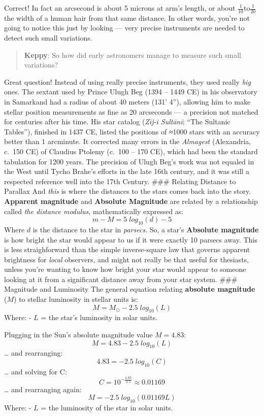 \documentclass[
  letterpaper,
]{book}
\begin{document}
Correct! In fact an arcsecond is about 5 microns at arm's length, or
about \(\frac{1}{10} \text{to} \frac{1}{20}\) the width of a human hair
from that same distance. In other words, you're not going to notice this
just by looking --- very precise instruments are needed to detect such
small variations.

\begin{quote}
\textbf{Keppy}: So how did early astronomers manage to measure such
small variations?
\end{quote}

Great question! Instead of using really precise instruments, they used
really \emph{big} ones. The sextant used by Prince Ulugh Beg (1394 --
1449 CE) in his observatory in Samarkand had a radius of about 40 meters
(131' 4''), allowing him to make stellar position measurements as fine
as 20 arcseconds --- a precision not matched for centuries after his
time. His star catalog (\emph{Zīj-i Sultānī}; ``The Sultanic Tables''),
finished in 1437 CE, listed the positions of ≈1000 stars with an
accuracy better than 1 arcminute. It corrected many errors in the
\emph{Almagest} (Alexandria, c.~150 CE) of Claudius Ptolemy (c.~100 --
170 CE), which had been the standard tabulation for 1200 years. The
precision of Ulugh Beg's work was not equaled in the West until Tycho
Brahe's efforts in the late 16th century, and it was still a respected
reference well into the 17th Century. \#\#\# Relating Distance to
Parallax And \emph{this} is where the distances to the stars comes back
into the story. \textbf{Apparent magnitude} and \textbf{Absolute
Magnitude} are related by a relationship called \emph{the distance
modulus}, mathematically expressed as: \[
m - M = 5\;log_{10}(d) - 5
\] Where \(d\) is the distance to the star in \emph{parsecs}. So, a
star's \textbf{Absolute magnitude} is how bright the star would appear
to us if it were exactly 10 parsecs away. This is less straighforward
than the simple inverse-square law that governs apparent brightness for
\emph{local} observers, and might not really be that useful for
thesiasts, unless you're wanting to know how bright your star would
appear to someone looking at it from a significant distance away from
your star system. \#\#\# Magnitude and Luminosity The general equation
relating \textbf{absolute magnitude} (\(M\)) to stellar luminosity in
stellar units is: \[
M = M_⊙ - 2.5\; log_{10}(L)
\] Where: - \(L\) = the star's luminosity in solar units.

Plugging in the Sun's absolute magnitude value \(M=4.83\): \[
M = 4.83 - 2.5\; log_{10}(L)
\] \ldots{} and rearranging: \[
4.83 = -2.5\;log_{10}(C)
\] \ldots{} and solving for C: \[
C = 10^{-\frac{4.83}{2.5}} \approx 0.01169
\] \ldots{} and rearranging again: \[
M = -2.5\;log_{10}(0.01169L)
\] Where: - \(L\) = the luminosity of the star in solar units.
\end{document}
